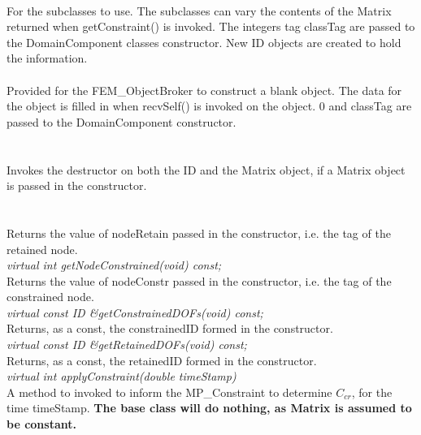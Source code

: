 \\
For the subclasses to use. The subclasses can vary the contents of the
Matrix returned when getConstraint() is invoked. 
The integers \p tag \p classTag are
passed to the DomainComponent classes constructor. New ID objects are
created to hold the information. \\

 \\
Provided for the FEM\_ObjectBroker to construct a blank object. The
data for the object is filled in when recvSelf() is invoked on
the object. $0$ and \p classTag are passed to the DomainComponent
constructor. \\ 

  \\
 \\
Invokes the destructor on both the ID and the Matrix object, if a
Matrix object is passed in the constructor. \\

  \\
 \\
Returns the value of \p nodeRetain passed in the constructor,
i.e. the tag of the retained node. \\

{\em virtual int getNodeConstrained(void) const;    }\\
Returns the value of \p nodeConstr passed in the constructor, i.e. the
tag of the constrained node. \\

{\em virtual const ID \&getConstrainedDOFs(void) const;   }\\     
Returns, as a const, the \p constrainedID formed in the constructor. \\

{\em virtual const ID \&getRetainedDOFs(void) const;   }\\     
Returns, as a const, the \p retainedID formed in the
constructor. \\

{\em virtual int applyConstraint(double timeStamp)}\\     
A method to invoked to inform the MP\_Constraint to determine $C_{cr}$,
for the time \p timeStamp. {\bf The base class will do nothing, as
Matrix is assumed to be constant.} \\

